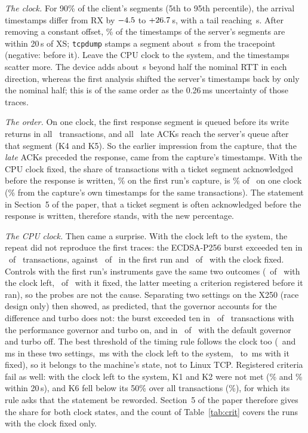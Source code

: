 \documentclass[9pt]{article}
\newcommand{\ms}{\,ms\xspace}
\begin{document}
\emph{The clock.} For 90\% of the client's segments (5th to 95th percentile), the arrival timestamps differ from RX by $-4.5$ to $+26.7$\,\textmu s, with a tail reaching \RpKOneMax\,\textmu s. After removing a constant offset, \RpKTwoPct\% of the timestamps of the server's segments are within 20\,\textmu s of XS; \texttt{tcpdump} stamps a segment about \RpKTwoMed\,\textmu s from the tracepoint (negative: before it). Leave the CPU clock to the system, and the timestamps scatter more. The device adds about \RpKThreeMed\,\textmu s beyond half the nominal RTT in each direction, whereas the first analysis shifted the server's timestamps back by only the nominal half; this is of the same order as the 0.26\ms uncertainty of those traces.

\emph{The order.} On one clock, the first response segment is queued before its write returns in all \RpKFourN\ transactions, and all \RpKFiveN\ late ACKs reach the server's queue after that segment (K4 and K5). So the earlier impression from the capture, that the \emph{late} ACKs preceded the response, came from the capture's timestamps. With the CPU clock fixed, the share of transactions with a ticket segment acknowledged before the response is written, \RaceBeforePct\% on the first run's capture, is \RpKSixPct\% of \RpKSixN\ on one clock (\RpKSixCapPct\% from the capture's own timestamps for the same transactions). The statement in Section~5 of the paper, that a ticket segment is often acknowledged before the response is written, therefore stands, with the new percentage.

\emph{The CPU clock.} Then came a surprise. With the clock left to the system, the repeat did not reproduce the first traces: the ECDSA-P256 burst exceeded ten in \BuUrEcUp\ of \BuUrEcN\ transactions, against \BuFirstEcUp\ of \BuFirstEcN\ in the first run and \BuPrEcUp\ of \BuPrEcN\ with the clock fixed. Controls with the first run's instruments gave the same two outcomes (\BuUcEcUp\ of \BuUcEcN\ with the clock left, \BuPcEcUp\ of \BuPcEcN\ with it fixed, the latter meeting a criterion registered before it ran), so the probes are not the cause. Separating two settings on the X250 (race design only) then showed, as predicted, that the governor accounts for the difference and turbo does not: the burst exceeded ten in \BuIsolAEcUp\ of \BuIsolAEcN\ transactions with the performance governor and turbo on, and in \BuIsolBEcUp\ of \BuIsolBEcN\ with the default governor and turbo off. The best threshold of the timing rule follows the clock too (\RaKSevenBestLo\ and \RbKSevenBestLo\ms in these two settings, \RuKSevenBestLo\ms with the clock left to the system, \RpKSevenBestLo\ to \RpKSevenBestHi\ms with it fixed), so it belongs to the machine's state, not to Linux TCP. Registered criteria fail as well: with the clock left to the system, K1 and K2 were not met (\RuKOnePct\% and \RuKTwoPct\% within 20\,\textmu s), and K6 fell below its 50\% over all transactions (\RuKSixPct\%), for which its rule asks that the statement be reworded. Section~5 of the paper therefore gives the share for both clock states, and the count of Table~\ref{tab:crit} covers the runs with the clock fixed only.
\end{document}
